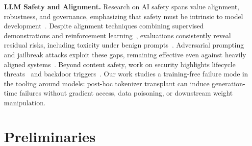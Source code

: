 \documentclass{article}
\theoremstyle{plain}
\theoremstyle{definition}
\theoremstyle{remark}
\begin{document}
\noindent\textbf{LLM Safety and Alignment.}
Research on AI safety spans value alignment, robustness, and governance, emphasizing that safety must be intrinsic to model development~\citep{shi2024holisticsurvey,zhang2025safety,liu2023trustworthy,huang2024survey,wang2025unique,yao2024survey,chen2024trustworthy,weidinger2021ethical,huang2024survey}.
Despite alignment techniques combining supervised demonstrations and reinforcement learning~\citep{ouyang2022instructgpt,stiennon2020summarize,ziegler2019humanprefs,bai2022constitutional,rafailov2023dpo,askell2021general,shen2023large,wang2023selfinstruct}, evaluations consistently reveal residual risks, including toxicity under benign prompts~\citep{gehman2020realtoxicityprompts,rottger2025safetyprompts,wen2023unveiling,ousidhoum2021probing,lin2022truthfulqa,perez2022redteaming,zhang2025large}.
Adversarial prompting and jailbreak attacks exploit these gaps, remaining effective even against heavily aligned systems~\citep{wei2023jailbroken,greshake2023promptinject,li2024jailbreakbench,xu2024autodan,yu2023gptfuzzer,hong2024curiosity,deng2024masterkey,xu2024comprehensive,yi2024jailbreak,peng2024jailbreaking,liao2025attack,wang2025large}.
Beyond content safety, work on security highlights lifecycle threats~\citep{pan2020privacy,li2023privacy,xu2024large,chen2024combating,debar2024emerging,wang2025unique,das2025security,yao2024survey} and backdoor triggers~\citep{zhao2024survey,zhou2025survey,cheng2025backdoor,wan2023poisoning,huang2024composite,min2024crow,zhao2024weak,li2024backdoorllm,liu2025elba}.
Our work studies a training-free failure mode in the tooling around models: post-hoc tokenizer transplant can induce generation-time failures without gradient access, data poisoning, or downstream weight manipulation.






\vspace{-2mm}
\section{Preliminaries}
\label{sec:prelim}

 
\end{document}
